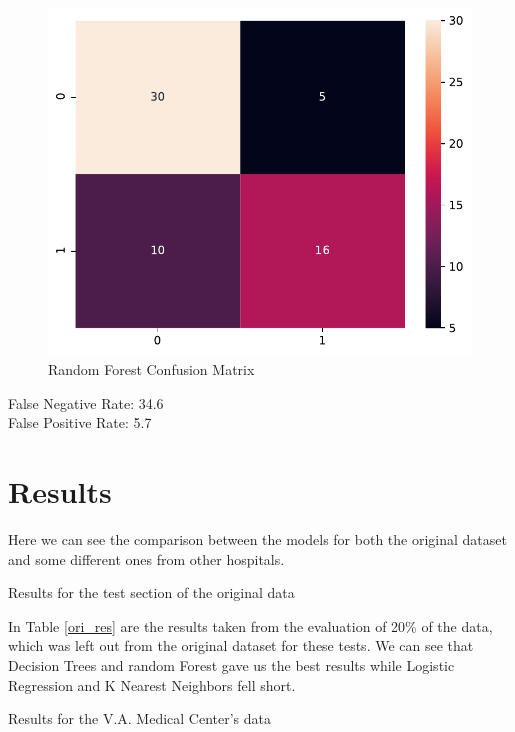 \documentclass[conference]{IEEEtran}
\begin{document}
\begin{figure}[H]
    \centerline{\includegraphics[width=0.8\linewidth]{images/random_forest_cm.pdf}}
    \caption{Random Forest Confusion Matrix}
    \label{rf_cm}
\end{figure}

\noindent
False Negative Rate: 34.6
\\False Positive Rate: 5.7
\newpage

\section{Results}

Here we can see the comparison between the models for both the original dataset and some different ones from other hospitals.

\begin{table}[htbp]
    \caption{Results for the test section of the original data}
    \begin{center}
        
        \label{ori_res}
    \end{center}
\end{table}

In Table \ref{ori_res} are the results taken from the evaluation of 20\% of the data, which was left out from the original dataset for these tests. We can see that Decision Trees and random Forest gave us the best results while Logistic Regression and K Nearest Neighbors fell short.

\begin{table}[htbp]
    \caption{Results for the V.A. Medical Center's data}
    \begin{center}
        
        \label{va_res}
    \end{center}
\end{table}
\end{document}
